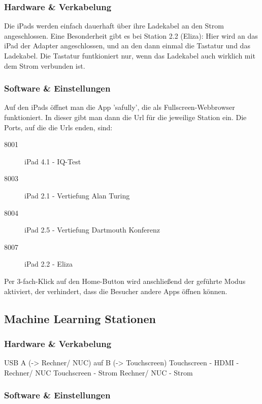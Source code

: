 \documentclass [titlepage,a4paper]{article}
\begin{document}
\subsubsection{Hardware \& Verkabelung}

Die iPads werden einfach dauerhaft über ihre Ladekabel an den Strom angeschlossen. Eine Besonderheit gibt es bei Station 2.2 (Eliza): Hier wird an das iPad der Adapter angeschlossen, und an den dann einmal die Tastatur und das Ladekabel. Die Tastatur funtkioniert nur, wenn das Ladekabel auch wirklich mit dem Strom verbunden ist.

\subsubsection{Software \& Einstellungen}

Auf den iPads öffnet man die App 'safully', die als Fullscreen-Webbrowser funktioniert. In dieser gibt man dann die Url für die jeweilige Station ein. Die Ports, auf die die Urls enden, sind: \begin{description}
    \item[8001] iPad 4.1 - IQ-Test 
    \item[8003] iPad 2.1 - Vertiefung Alan Turing
    \item[8004] iPad 2.5 - Vertiefung Dartmouth Konferenz
    \item[8007] iPad 2.2 - Eliza 
\end{description}

Per 3-fach-Klick auf den Home-Button wird anschließend der geführte Modus aktiviert, der verhindert, dass die Besucher andere Apps öffnen können. 

\subsection{Machine Learning Stationen}

\subsubsection{Hardware \& Verkabelung}

USB A (-> Rechner/ NUC) auf B (-> Touchscreen)
Touchscreen - HDMI - Rechner/ NUC
Touchscreen - Strom
Rechner/ NUC - Strom

\subsubsection{Software \& Einstellungen}
\end{document}

